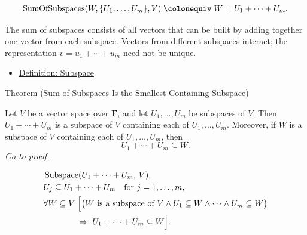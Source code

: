 \begin{remark*}
\[
\operatorname{SumOfSubspaces}(W,\{U_1,\dots,U_m\},V)
\;\colonequiv\;
W=U_1+\cdots+U_m.
\]
\end{remark*}

\begin{remark*}[Interpretation]
The sum of subspaces consists of all vectors that can be built by adding
together one vector from each subspace. Vectors from different subspaces
interact; the representation $v = u_1 + \cdots + u_m$ need not be unique.
\end{remark*}

\begin{dependencies}
\begin{itemize}
  \item \hyperref[def:subspace]{Definition: Subspace}
\end{itemize}
\end{dependencies}


\begin{theorembox}{Theorem (Sum of Subspaces Is the Smallest Containing Subspace)}
\begin{theorem}
\label{thm:sum-of-subspaces-smallest-containing}
Let $V$ be a vector space over $\mathbf{F}$, and let
$U_1,\dots,U_m$ be subspaces of $V$.
Then $U_1+\cdots+U_m$ is a subspace of $V$ containing each of
$U_1,\dots,U_m$.
Moreover, if $W$ is a subspace of $V$ containing each of
$U_1,\dots,U_m$, then
\[
U_1+\cdots+U_m \subseteq W.
\]
\hyperref[prf:sum-of-subspaces-smallest-containing]{\textit{Go to proof.}}
\end{theorem}
\end{theorembox}

\begin{remark*}
\[
\begin{aligned}
&\operatorname{Subspace}(U_1+\cdots+U_m,\,V), \\
&U_j \subseteq U_1+\cdots+U_m \quad \text{for } j=1,\dots,m, \\
&\forall W \subseteq V\;
\Bigl[
\bigl(W \text{ is a subspace of } V
\land U_1 \subseteq W \land \cdots \land U_m \subseteq W\bigr) \\
&\qquad\qquad\Rightarrow\;
U_1+\cdots+U_m \subseteq W
\Bigr].
\end{aligned}
\]
\end{remark*}

